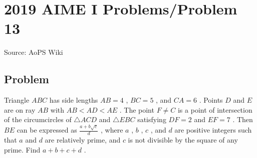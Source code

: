 \documentclass[12pt]{article}
\begin{document}
\section*{{2019 AIME I Problems/Problem 13}}
Source: AoPS Wiki

\subsection*{Problem}
Triangle $ABC$ has side lengths $AB=4$ , $BC=5$ , and $CA=6$ . Points $D$ and $E$ are on ray $AB$ with $AB<AD<AE$ . The point $F \neq C$ is a point of intersection of the circumcircles of $\triangle ACD$ and $\triangle EBC$ satisfying $DF=2$ and $EF=7$ . Then $BE$ can be expressed as $\tfrac{a+b\sqrt{c}}{d}$ , where $a$ , $b$ , $c$ , and $d$ are positive integers such that $a$ and $d$ are relatively prime, and $c$ is not divisible by the square of any prime. Find $a+b+c+d$ .
\end{document}
